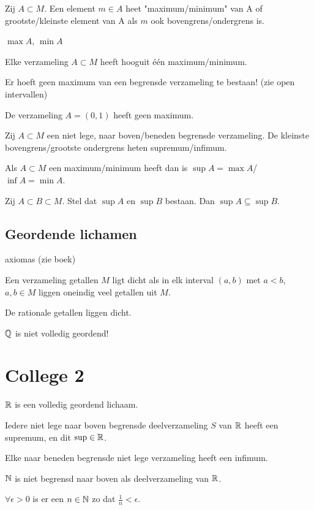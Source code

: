\documentclass[week=1]{homework}
\begin{document}
	 Zij $A \subset M$. Een element $m \in A$ heet "maximum/minimum" van A of grootste/kleinste element van A als $m$ ook bovengrens/ondergrens is. 
	
	\Not $\max A$,  $\min A$
	
	\Stel Elke verzameling $A \subset M$ heeft hooguit \'e\'en maximum/minimum.
	
	\Letop Er hoeft geen maximum van een begrensde verzameling te bestaan! (zie open intervallen)
	
	\Stel De verzameling $A = (0,1)$ heeft geen maximum. 
	
	\vspace{5mm}
	 Zij $A \subset M$ een niet lege, naar boven/beneden begrensde verzameling. De kleinste bovengrens/grootste ondergrens heten supremum/infimum. 
	
	\Stel Als $A \subset M$ een maximum/minimum heeft dan is $\sup A = \max A$/$\inf A = \min A$.
	
	\Stel Zij $A \subset B \subset M$. Stel dat $\sup A$ en $\sup B$ bestaan. Dan $\sup A \subseteq \sup B$.
	
	\subsection*{Geordende lichamen}
	 axiomas (zie boek)
	
	 Een verzameling getallen $M$ ligt dicht als in elk interval $(a,b)$ met $a<b$, $a,b \in M$ liggen oneindig veel getallen uit $M$.
	
	\Stel De rationale getallen liggen dicht. 
	
	\Stel $\mathbb{Q}$ is niet volledig geordend! 
	
	
	\newpage
	\section*{College 2}
	\Stel $\mathbb{R}$ is een volledig geordend lichaam. 
	
	\Def[Axioma 13] Iedere niet lege naar boven begrensde deelverzameling $S$ van $\mathbb{R}$ heeft een supremum, en dit $\sup \in \mathbb{R}$. 
	
	\Stel Elke naar beneden begrensde niet lege verzameling heeft een infimum. 
	
	\Stel[1.7.8] $\mathbb{N}$ is niet begrensd naar boven als deelverzameling van $\mathbb{R}$.  
	
	\Stel $\forall \epsilon > 0$ is er een $n \in \mathbb{N}$ zo dat $\frac{1}{n} < \epsilon$. 
	
\end{document}
